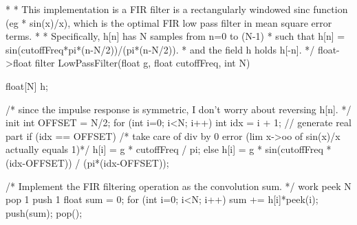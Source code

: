  *
 * This implementation is a FIR filter is a rectangularly windowed sinc function (eg
 * sin(x)/x), which is the optimal FIR low pass filter in mean square error terms.
 *
 * Specifically, h[n] has N samples from n=0 to (N-1)
 * such that h[n] = sin(cutoffFreq*pi*(n-N/2))/(pi*(n-N/2)).
 * and the field h holds h[-n].
 */
float->float filter LowPassFilter(float g, float cutoffFreq, int N) {
    float[N] h;

    /* since the impulse response is symmetric, I don't worry about reversing h[n]. */
    init {
        int OFFSET = N/2;
        for (int i=0; i<N; i++) {
            int idx = i + 1;
            // generate real part
            if (idx == OFFSET) 
                /* take care of div by 0 error (lim x->oo of sin(x)/x actually equals 1)*/
                h[i] = g * cutoffFreq / pi; 
            else 
                h[i] = g * sin(cutoffFreq * (idx-OFFSET)) / (pi*(idx-OFFSET));
        }
    }

    /* Implement the FIR filtering operation as the convolution sum. */
    work peek N pop 1 push 1 {
        float sum = 0;
        for (int i=0; i<N; i++) { 
            sum += h[i]*peek(i);
        }
        push(sum);
        pop();
    }
}
